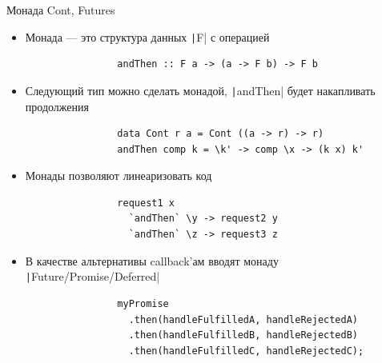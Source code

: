     \begin{frame}[fragile]{Монада Cont, Futures}
        \begin{itemize}
            \item Монада --- это структура данных \texttt|F| с операцией
            \begin{verbatim}
                andThen :: F a -> (a -> F b) -> F b
            \end{verbatim}
            \item Следующий тип можно сделать монадой, \texttt|andThen| будет накапливать продолжения
            \begin{verbatim}
                data Cont r a = Cont ((a -> r) -> r)
                andThen comp k = \k' -> comp \x -> (k x) k'
            \end{verbatim}
            \item \pause Монады позволяют линеаризовать код
            \begin{verbatim}
                request1 x
                  `andThen` \y -> request2 y
                  `andThen` \z -> request3 z
            \end{verbatim}
            \item В качестве альтернативы callback'ам вводят монаду \texttt|Future/Promise/Deferred|
            \begin{verbatim}
                myPromise
                  .then(handleFulfilledA, handleRejectedA)
                  .then(handleFulfilledB, handleRejectedB)
                  .then(handleFulfilledC, handleRejectedC);
            \end{verbatim}
        \end{itemize}
    \end{frame}

